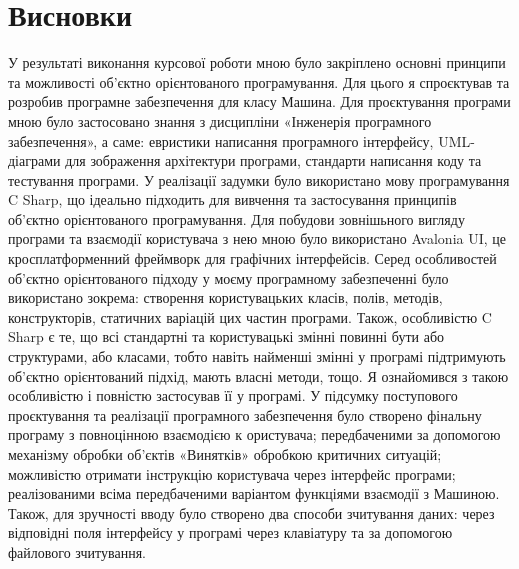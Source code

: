\documentclass[14pt]{extarticle}
\begin{document}
\section{Висновки}
У результаті виконання курсової роботи мною було закріплено основні 
принципи та можливості об'єктно орієнтованого програмування. Для цього 
я спроєктував та розробив програмне забезпечення для класу Машина. 
Для проєктування програми мною було застосовано знання з дисципліни 
«Інженерія програмного забезпечення», а саме: евристики написання 
програмного інтерфейсу, UML-діаграми для зображення архітектури
 програми, стандарти написання коду та тестування програми. 
У реалізації задумки було використано мову програмування C Sharp, 
що ідеально підходить для вивчення та застосування принципів об'єктно 
орієнтованого програмування. Для побудови зовнішьного вигляду програми
 та взаємодії користувача з нею мною було використано Avalonia UI, це 
 кросплатформенний фреймворк для графічних інтерфейсів.
Серед особливостей об’єктно орієнтованого підходу у моєму програмному 
забезпеченні було використано зокрема: створення користувацьких класів,
 полів, методів, конструкторів, статичних варіацій цих частин програми. 
 Також, особливістю C Sharp є те, що всі стандартні та користувацькі змінні 
 повинні бути або структурами, або класами, тобто навіть найменші змінні
  у програмі підтримують об’єктно орієнтований підхід, мають власні 
  методи, тощо. Я ознайомився з такою особливістю і повністю застосував
   її у програмі.
У підсумку поступового проєктування та реалізації програмного 
забезпечення було створено фінальну програму з повноцінною взаємодією к
ористувача; передбаченими за допомогою механізму обробки об’єктів
 «Винятків» обробкою критичних ситуацій; можливістю отримати 
 інструкцію користувача через інтерфейс програми; реалізованими всіма 
 передбаченими варіантом функціями взаємодії з Машиною.
Також, для зручності вводу було створено два способи зчитування даних: 
через відповідні поля інтерфейсу у програмі через клавіатуру та за
 допомогою файлового зчитування.
\end{document}
